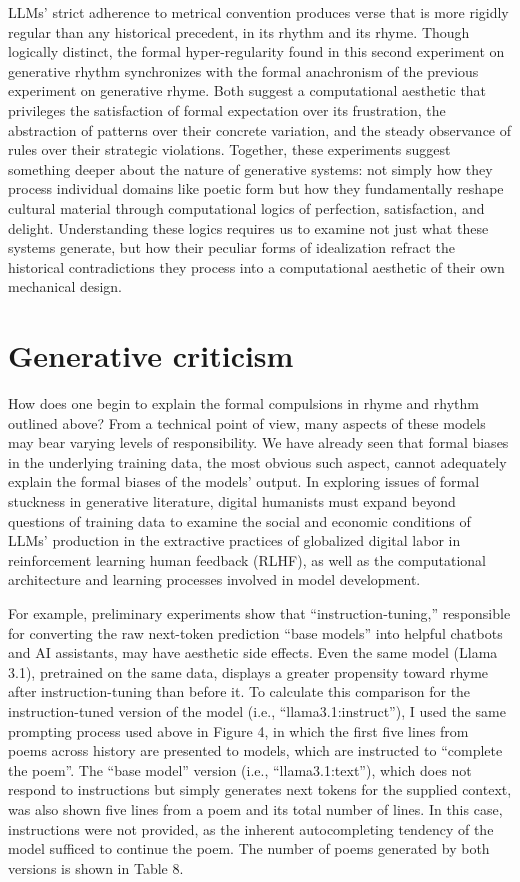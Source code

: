 \documentclass{simple-humanities}         %
\begin{document}
LLMs' strict adherence to metrical convention produces verse that is more rigidly regular than any historical precedent, in its rhythm and its rhyme.
Though logically distinct, the formal hyper-regularity found in this second experiment on generative rhythm synchronizes with the formal anachronism of the previous experiment on generative rhyme.
Both suggest a computational aesthetic that privileges the satisfaction of formal expectation over its frustration, the abstraction of patterns over their concrete variation, and the steady observance of rules over their strategic violations.
Together, these experiments suggest something deeper about the nature of generative systems: not simply how they process individual domains like poetic form but how they fundamentally reshape cultural material through computational logics of perfection, satisfaction, and delight. 
Understanding these logics requires us to examine not just what these systems generate, but how their peculiar forms of idealization refract the historical contradictions they process into a computational aesthetic of their own mechanical design.

\section{Generative criticism}\label{generative-criticism}

How does one begin to explain the formal compulsions in rhyme and rhythm outlined above?
From a technical point of view, many aspects of these models may bear varying levels of responsibility.
We have already seen that formal biases in the underlying training data, the most obvious such aspect, cannot adequately explain the formal biases of the models' output.
In exploring issues of formal stuckness in generative literature, digital humanists must expand beyond questions of training data to examine the social and economic conditions of LLMs' production in the extractive practices of globalized digital labor in reinforcement learning human feedback (RLHF), as well as the computational architecture and learning processes involved in model development.

For example, preliminary experiments show that ``instruction-tuning,'' responsible for converting the raw next-token prediction ``base models'' into helpful chatbots and AI assistants, may have aesthetic side effects. 
Even the same model (Llama 3.1), pretrained on the same data, displays a greater propensity toward rhyme after instruction-tuning than before it.
To calculate this comparison for the instruction-tuned version of the model (i.e., ``llama3.1:instruct''), I used the same prompting process used above in Figure 4, in which the first five lines from poems across history are presented to models, which are instructed to ``complete the poem''.
The ``base model'' version (i.e., ``llama3.1:text''), which does not respond to instructions but simply generates next tokens for the supplied context, was also shown five lines from a poem and its total number of lines.
In this case, instructions were not provided, as the inherent autocompleting tendency of the model sufficed to continue the poem. 
The number of poems generated by both versions is shown in Table 8.
\end{document}
